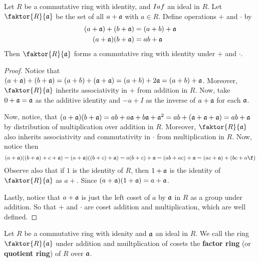 \begin{theorem}\label{1.3.3}
    Let $R$ be a commutative ring with identity, and $I\\af$ an ideal in $R$.
    Let  $\faktor{R}{\af}$ be the set
    of all $a+\mathfrak{a}$ with  $a \in R$. Define operations $+$ and $\cdot$ by
    \begin{align*}
        (a+\mathfrak{a})+(b+\mathfrak{a}) &=  (a+b)+\mathfrak{a} \\
        (a+\mathfrak{a})(b+\mathfrak{a})  &=  ab+\mathfrak{a}    \\
    \end{align*}
    Then $\faktor{R}{\af}$ forms a commutative ring with identity under  $+$ and
    $\cdot$.
\end{theorem}
\begin{proof}
    Notice that $(a+\mathfrak{a})+(b+\mathfrak{a})=(a+b)+(\mathfrak{a}+\mathfrak{a})=(a+b)+2\mathfrak{a}=(a+b)+\mathfrak{a}$. Moreover,
    $\faktor{R}{\af}$ inherits associativity in $+$ from addition in $R$. Now,
    take $0+\mathfrak{a}=\mathfrak{a}$ as the additive identity and  $-a+I$ as the inverse of
    $a+\mathfrak{a}$ for each $\mathfrak{a}$.

    Now, notice, that $(a+\mathfrak{a})(b+\mathfrak{a})=ab+a\mathfrak{a}+b\mathfrak{a}+\mathfrak{a}^2=ab+(\mathfrak{a}+\mathfrak{a}+\mathfrak{a})=
    ab+\mathfrak{a}$ by distribution of multiplication over addition in $R$. Moreover,
    $\faktor{R}{\af}$ also inherits associativity and commutativity in $\cdot$
    from multiplication in $R$. Now, notice then
    \begin{equation*}
        (a+\af)((b+\af)+c+\af)=(a+\af)((b+c)+\af)=a(b+c)+\af=(ab+ac)+\af=
        (ac+\af)+(bc+a\f)
    \end{equation*}
    Observe also that if $1$ is the identity of $R$, then $1+\mathfrak{a}$ is the
    identity of  $\faktor{R}{\af}$ as $a+$. Since $(a+\mathfrak{a})(1+\mathfrak{a})=a+\mathfrak{a}$.

    Lastly, notice that $a+\mathfrak{a}$ is just the left coset of  $a$ by  $\mathfrak{a}$ in $R$ as a
    group under addition. So that $+$ and  $\cdot$ are coset addition and
    multiplication, which are well defined.
\end{proof}

\begin{definition}
    Let $R$ be a commutative ring with idenity and $\mathfrak{a}$ an ideal in $R$. We
    call the ring $\faktor{R}{\af}$ under addition and muiltplication of cosets
    the \textbf{factor ring} (or \textbf{quotient ring}) of $R$ over  $\mathfrak{a}$.
\end{definition}


